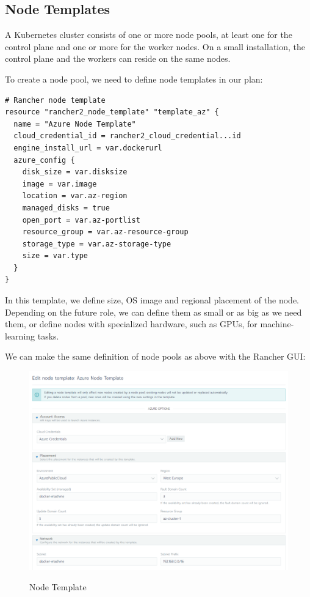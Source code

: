 \subsection{Node Templates}

A Kubernetes cluster consists of one or more node pools, at least one for the control plane and one or more for the worker nodes. On a small installation, the control plane and the workers can reside on the same nodes.

To create a node pool, we need to define node templates in our plan:

\begin{lstlisting}[caption=Node Template, frame=single, basicstyle=\ttfamily]
# Rancher node template
resource "rancher2_node_template" "template_az" {
  name = "Azure Node Template"
  cloud_credential_id = rancher2_cloud_credential...id
  engine_install_url = var.dockerurl
  azure_config {
    disk_size = var.disksize
    image = var.image
    location = var.az-region
    managed_disks = true
    open_port = var.az-portlist
    resource_group = var.az-resource-group
    storage_type = var.az-storage-type
    size = var.type
  }
}
\end{lstlisting}

In this template, we define size, OS image and regional placement of the node. Depending on the future role, we can define them as small or as big as we need them, or define nodes with specialized hardware, such as GPUs, for machine-learning tasks.

We can make the same definition of node pools as above with the Rancher GUI:

\begin{figure}[H]
\centering
\caption {Node Template}
\includegraphics[width=\linewidth]{images/node-template.png}
\label{fig:nodeTemplate}
\end{figure}

